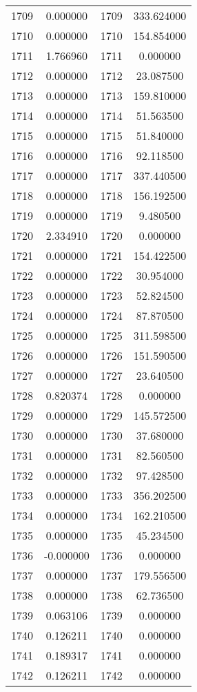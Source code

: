 \documentclass[12pt]{article}
\begin{document}
\begin{longtable}{@{}cccc@{}}
1709 & 0.000000 & 1709 & 333.624000 \\
1710 & 0.000000 & 1710 & 154.854000 \\
1711 & 1.766960 & 1711 & 0.000000 \\
1712 & 0.000000 & 1712 & 23.087500 \\
1713 & 0.000000 & 1713 & 159.810000 \\
1714 & 0.000000 & 1714 & 51.563500 \\
1715 & 0.000000 & 1715 & 51.840000 \\
1716 & 0.000000 & 1716 & 92.118500 \\
1717 & 0.000000 & 1717 & 337.440500 \\
1718 & 0.000000 & 1718 & 156.192500 \\
1719 & 0.000000 & 1719 & 9.480500 \\
1720 & 2.334910 & 1720 & 0.000000 \\
1721 & 0.000000 & 1721 & 154.422500 \\
1722 & 0.000000 & 1722 & 30.954000 \\
1723 & 0.000000 & 1723 & 52.824500 \\
1724 & 0.000000 & 1724 & 87.870500 \\
1725 & 0.000000 & 1725 & 311.598500 \\
1726 & 0.000000 & 1726 & 151.590500 \\
1727 & 0.000000 & 1727 & 23.640500 \\
1728 & 0.820374 & 1728 & 0.000000 \\
1729 & 0.000000 & 1729 & 145.572500 \\
1730 & 0.000000 & 1730 & 37.680000 \\
1731 & 0.000000 & 1731 & 82.560500 \\
1732 & 0.000000 & 1732 & 97.428500 \\
1733 & 0.000000 & 1733 & 356.202500 \\
1734 & 0.000000 & 1734 & 162.210500 \\
1735 & 0.000000 & 1735 & 45.234500 \\
1736 & -0.000000 & 1736 & 0.000000 \\
1737 & 0.000000 & 1737 & 179.556500 \\
1738 & 0.000000 & 1738 & 62.736500 \\
1739 & 0.063106 & 1739 & 0.000000 \\
1740 & 0.126211 & 1740 & 0.000000 \\
1741 & 0.189317 & 1741 & 0.000000 \\
1742 & 0.126211 & 1742 & 0.000000 \\

\end{longtable}
\end{document}
